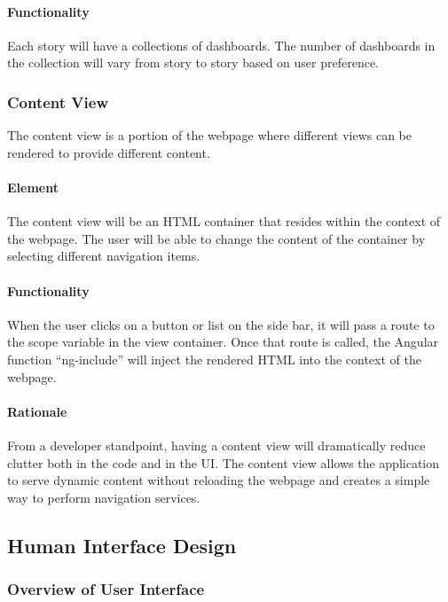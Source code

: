         \paragraph{Functionality}
            Each story will have a collections of dashboards. The number of dashboards in the collection will vary from story to story based on user preference.
    
    \subsubsection{Content View}
        The content view is a portion of the webpage where different views can be rendered to provide different content.
        \paragraph{Element} 
            The content view will be an HTML container that resides within the context of the webpage. The user will be able to change the content of the container by selecting different navigation items.
        \paragraph{Functionality}
            When the user clicks on a button or list on the side bar, it will pass a route to the scope variable in the view container. Once that route is called, the Angular function ``ng-include'' will inject the rendered HTML into the context of the webpage.
        \paragraph{Rationale} 
            From a developer standpoint, having a content view will dramatically reduce clutter both in the code and in the UI. The content view allows the application to serve dynamic content without reloading the webpage and creates a simple way to perform navigation services.



\subsection{Human Interface Design}
\subsubsection{Overview of User Interface}

